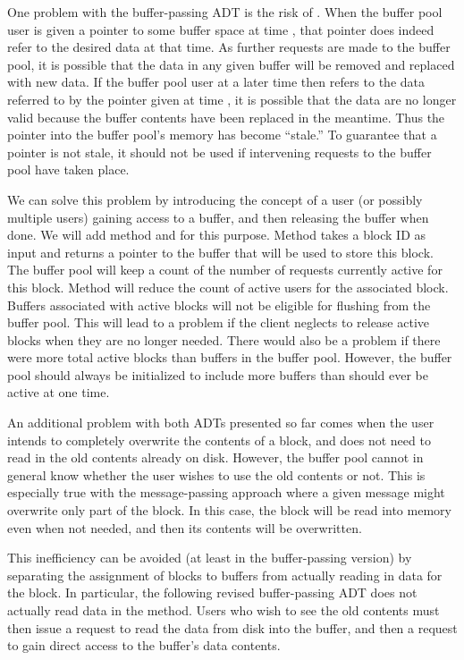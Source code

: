 One problem with the buffer-passing ADT is the risk of
.
When the buffer pool user is given a pointer to some buffer
space at time , that pointer does indeed refer to the desired
data at that time.
As further requests are made to the buffer pool, it is possible that
the data in any given buffer will be removed and replaced with new
data.
If the buffer pool user at a later time  then refers to the
data referred to by the pointer given at time , it is possible 
that the data are no longer valid because the buffer contents have
been replaced in the meantime.
Thus the pointer into the buffer pool's memory has become ``stale.''
To guarantee that a pointer is not stale, it should not be used if
intervening requests to the buffer pool have taken place.

We can solve this problem by introducing the concept of a user (or
possibly multiple users) gaining access to a buffer, and then
releasing the buffer when done.
We will add method  and  for
this purpose.
Method  takes a block ID as input and returns a
pointer to the buffer that will be used to store this block.
The buffer pool will keep a count of the number of requests currently
active for this block.
Method  will reduce the count of active users for
the associated block.
Buffers associated with active blocks will not be eligible for
flushing from the buffer pool.
This will lead to a problem if the client neglects to release active
blocks when they are no longer needed.
There would also be a problem if there were more total active blocks
than buffers in the buffer pool.
However, the buffer pool should always be initialized to include more
buffers than should ever be active at one time.

An additional problem with both ADTs presented so far comes when the
user intends to completely overwrite the contents of a block, and does
not need to read in the old contents already on disk.
However, the buffer pool cannot in general know whether the user
wishes to use the old contents or not.
This is especially true with the message-passing approach where a
given message might overwrite only part of the block.
In this case, the block will be read into memory even when not needed,
and then its contents will be overwritten.

This inefficiency can be avoided (at least in the buffer-passing
version) by separating the assignment of
blocks to buffers from actually reading in data for the block.
In particular, the following revised buffer-passing ADT does not
actually read data in the  method.
Users who wish to see the old contents must then issue a
 request to read the data from disk into the buffer,
and then a  request to gain direct access to the
buffer's data contents.

